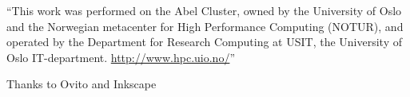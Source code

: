 \begin{acknowledgements}
``This work was performed on the Abel Cluster, owned by the University of Oslo and the Norwegian metacenter for High Performance Computing (NOTUR), and operated by the Department for Research Computing at USIT, the University of Oslo IT-department. \url{http://www.hpc.uio.no/}''

Thanks to Ovito\cite{stukowski2010ovito} and Inkscape\cite{webinkscape}

\end{acknowledgements}

